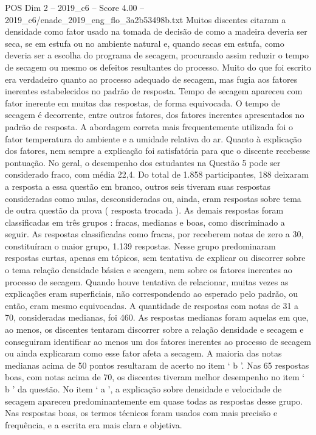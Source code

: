 \begin{textsample}{POS Dim 2 – 2019\_c6 – Score 4.00 – 2019\_c6/enade\_2019\_eng\_flo\_3a2b53498b.txt}
Muitos discentes citaram a densidade como fator usado na tomada de decisão de como a madeira deveria ser seca, se em estufa ou no ambiente natural e, quando secas em estufa, como deveria ser a escolha do programa de secagem, procurando assim reduzir o tempo de secagem ou mesmo os defeitos resultantes do processo.
Muito do que foi escrito era verdadeiro quanto ao processo adequado de secagem, mas fugia aos fatores inerentes estabelecidos no padrão de resposta.
Tempo de secagem apareceu com fator inerente em muitas das respostas, de forma equivocada.
O tempo de secagem é decorrente, entre outros fatores, dos fatores inerentes apresentados no padrão de resposta.
A abordagem correta mais frequentemente utilizada foi o fator temperatura do ambiente e a umidade relativa do ar.
Quanto à explicação dos fatores, nem sempre a explicação foi satisfatória para que o discente recebesse pontuação.
No geral, o desempenho dos estudantes na Questão 5 pode ser considerado fraco, com média 22,4.
Do total de 1.858 participantes, 188 deixaram a resposta a essa questão em branco, outros seis tiveram suas respostas consideradas como nulas, desconsideradas ou, ainda, eram respostas sobre tema de outra questão da prova ( resposta trocada ).
As demais respostas foram classificadas em três grupos : fracas, medianas e boas, como discriminado a seguir.
As respostas classificadas como fracas, por receberem notas de zero a 30, constituíram o maior grupo, 1.139 respostas.
Nesse grupo predominaram respostas curtas, apenas em tópicos, sem tentativa de explicar ou discorrer sobre o tema relação densidade básica e secagem, nem sobre os fatores inerentes ao processo de secagem.
Quando houve tentativa de relacionar, muitas vezes as explicações eram superficiais, não correspondendo ao esperado pelo padrão, ou então, eram mesmo equivocadas.
A quantidade de respostas com notas de 31 a 70, consideradas medianas, foi 460.
As respostas medianas foram aquelas em que, ao menos, os discentes tentaram discorrer sobre a relação densidade e secagem e conseguiram identificar ao menos um dos fatores inerentes ao processo de secagem ou ainda explicaram como esse fator afeta a secagem.
A maioria das notas medianas acima de 50 pontos resultaram de acerto no item ‘ b ’.
Nas 65 respostas boas, com notas acima de 70, os discentes tiveram melhor desempenho no item ‘ b ’ da questão.
No item ‘ a ’, a explicação sobre densidade e velocidade de secagem apareceu predominantemente em quase todas as respostas desse grupo.
Nas respostas boas, os termos técnicos foram usados com mais precisão e frequência, e a escrita era mais clara e objetiva.

\end{textsample}
